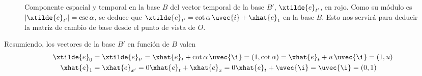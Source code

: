 \begin{figure}[ht]
\begin{minipage}{0.45\linewidth}
    \caption{Componente espacial y temporal en la base $B$ del vector temporal de la
      base $B'$, $\xtilde{e}_{t'}$, en rojo.
      Como su módulo es $|\xtilde{e}_{t'}|= \csc\alpha$, se deduce que
      $\xtilde{e}_{t'} = \cot\alpha\,\uvec{i} + \xhat{e}_t$ en la base $B$. Esto nos
      servirá para deducir la matriz de cambio de base desde el punto de vista de $O$.}
    \label{fig:R2-oblic_etprima}
  \end{minipage}
\end{figure}

Resumiendo, los vectores de la base $B'$ en función de $B$ valen
\begin{align}
  \label{eq:R2-oblic_cov_e0_et}
  \xtilde{e}_0
  &=
    \xtilde{e}_{t'}
    = \xhat{e}_t + \cot\alpha\,\uvec{\i}
    = (1, \cot\alpha)
    = \xhat{e}_t + u\,\uvec{\i}
    =(1, u)\\
  \label{eq:R2-oblic_cov_e1_ex}
  \xhat{e}_1
  &=
    \xhat{e}_{x'}
    = 0\xhat{e}_t+\xhat{e}_x
    = 0\xhat{e}_t + \uvec{\i}
    = \uvec{\i}
    = (0, 1)
\end{align}

